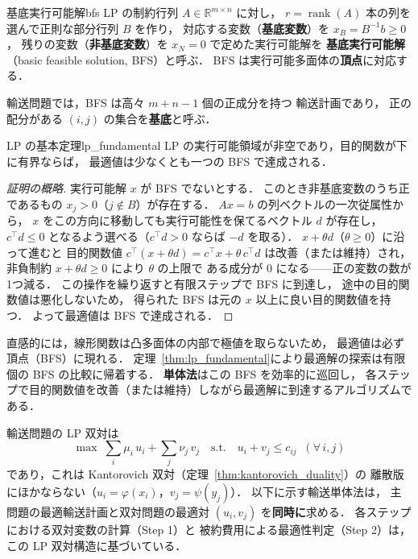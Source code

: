 \documentclass[uplatex, dvipdfmx]{jsarticle}
\begin{document}
\begin{definition}{基底実行可能解}{bfs}
LP の制約行列 $A\in\mathbb{R}^{m\times n}$ に対し，
$r=\operatorname{rank}(A)$ 本の列を選んで正則な部分行列 $B$ を作り，
対応する変数（\textbf{基底変数}）を $x_B=B^{-1}b\ge 0$，
残りの変数（\textbf{非基底変数}）を $x_N=0$ で定めた実行可能解を
\textbf{基底実行可能解}（basic feasible solution, BFS）と呼ぶ．
BFS は実行可能多面体の\textbf{頂点}に対応する．

輸送問題では，BFS は高々 $m+n-1$ 個の正成分を持つ
輸送計画であり，
正の配分がある $(i,j)$ の集合を\textbf{基底}と呼ぶ．
\end{definition}

\begin{theorem}{LP の基本定理}{lp_fundamental}
LP の実行可能領域が非空であり，目的関数が下に有界ならば，
最適値は少なくとも一つの BFS で達成される．
\end{theorem}

\begin{proof}[証明の概略]
実行可能解 $x$ が BFS でないとする．
このとき非基底変数のうち正であるもの $x_j>0$（$j\notin B$）が存在する．
$Ax=b$ の列ベクトルの一次従属性から，
$x$ をこの方向に移動しても実行可能性を保てるベクトル $d$ が存在し，
$c^\top d\le 0$ となるよう選べる（$c^\top d>0$ ならば $-d$ を取る）．
$x+\theta d$（$\theta\ge 0$）に沿って進むと
目的関数値 $c^\top(x+\theta d)=c^\top x+\theta\,c^\top d$ は改善（または維持）され，
非負制約 $x+\theta d\ge 0$ により $\theta$ の上限で
ある成分が $0$ になる——正の変数の数が1つ減る．
この操作を繰り返すと有限ステップで BFS に到達し，
途中の目的関数値は悪化しないため，
得られた BFS は元の $x$ 以上に良い目的関数値を持つ．
よって最適値は BFS で達成される．
\end{proof}

直感的には，線形関数は凸多面体の内部で極値を取らないため，
最適値は必ず頂点（BFS）に現れる．
定理~\ref{thm:lp_fundamental}により最適解の探索は有限個の BFS の比較に帰着する．
\textbf{単体法}はこの BFS を効率的に巡回し，
各ステップで目的関数値を改善（または維持）しながら最適解に到達するアルゴリズムである．

輸送問題の LP 双対は
\[
  \max\;\textstyle\sum_i \mu_i\,u_i + \sum_j \nu_j\,v_j
  \quad\text{s.t.}\quad u_i + v_j \le c_{ij}\;\;(\forall\,i,j)
\]
であり，これは Kantorovich 双対（定理~\ref{thm:kantorovich_duality}）の
離散版にほかならない（$u_i=\varphi(x_i)$，$v_j=\psi(y_j)$）．
以下に示す輸送単体法は，
主問題の最適輸送計画と双対問題の最適対 $(u_i,v_j)$ を\textbf{同時に}求める．
各ステップにおける双対変数の計算（Step 1）と
被約費用による最適性判定（Step 2）は，
この LP 双対構造に基づいている．
\end{document}
